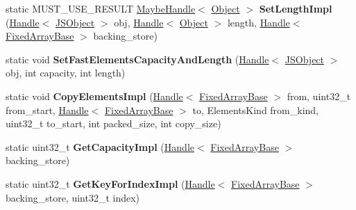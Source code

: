 \begin{DoxyCompactItemize}
\item 
\hypertarget{classv8_1_1internal_1_1_elements_accessor_base_ac2c15b95e2700cd2e8441011d1347d96}{}static M\+U\+S\+T\+\_\+\+U\+S\+E\+\_\+\+R\+E\+S\+U\+L\+T \hyperlink{classv8_1_1internal_1_1_maybe_handle}{Maybe\+Handle}$<$ \hyperlink{classv8_1_1internal_1_1_object}{Object} $>$ {\bfseries Set\+Length\+Impl} (\hyperlink{classv8_1_1internal_1_1_handle}{Handle}$<$ \hyperlink{classv8_1_1internal_1_1_j_s_object}{J\+S\+Object} $>$ obj, \hyperlink{classv8_1_1internal_1_1_handle}{Handle}$<$ \hyperlink{classv8_1_1internal_1_1_object}{Object} $>$ length, \hyperlink{classv8_1_1internal_1_1_handle}{Handle}$<$ \hyperlink{classv8_1_1internal_1_1_fixed_array_base}{Fixed\+Array\+Base} $>$ backing\+\_\+store)\label{classv8_1_1internal_1_1_elements_accessor_base_ac2c15b95e2700cd2e8441011d1347d96}

\item 
\hypertarget{classv8_1_1internal_1_1_elements_accessor_base_a0995c733f37f0fd2317efc48dc145bc6}{}static void {\bfseries Set\+Fast\+Elements\+Capacity\+And\+Length} (\hyperlink{classv8_1_1internal_1_1_handle}{Handle}$<$ \hyperlink{classv8_1_1internal_1_1_j_s_object}{J\+S\+Object} $>$ obj, int capacity, int length)\label{classv8_1_1internal_1_1_elements_accessor_base_a0995c733f37f0fd2317efc48dc145bc6}

\item 
\hypertarget{classv8_1_1internal_1_1_elements_accessor_base_a4572ad073143e585cede1aa1d5df5706}{}static void {\bfseries Copy\+Elements\+Impl} (\hyperlink{classv8_1_1internal_1_1_handle}{Handle}$<$ \hyperlink{classv8_1_1internal_1_1_fixed_array_base}{Fixed\+Array\+Base} $>$ from, uint32\+\_\+t from\+\_\+start, \hyperlink{classv8_1_1internal_1_1_handle}{Handle}$<$ \hyperlink{classv8_1_1internal_1_1_fixed_array_base}{Fixed\+Array\+Base} $>$ to, Elements\+Kind from\+\_\+kind, uint32\+\_\+t to\+\_\+start, int packed\+\_\+size, int copy\+\_\+size)\label{classv8_1_1internal_1_1_elements_accessor_base_a4572ad073143e585cede1aa1d5df5706}

\item 
\hypertarget{classv8_1_1internal_1_1_elements_accessor_base_a53f0b4465e08c70be7521c619f0eae7b}{}static uint32\+\_\+t {\bfseries Get\+Capacity\+Impl} (\hyperlink{classv8_1_1internal_1_1_handle}{Handle}$<$ \hyperlink{classv8_1_1internal_1_1_fixed_array_base}{Fixed\+Array\+Base} $>$ backing\+\_\+store)\label{classv8_1_1internal_1_1_elements_accessor_base_a53f0b4465e08c70be7521c619f0eae7b}

\item 
\hypertarget{classv8_1_1internal_1_1_elements_accessor_base_a15da950f9e4e98722f52648e047b6511}{}static uint32\+\_\+t {\bfseries Get\+Key\+For\+Index\+Impl} (\hyperlink{classv8_1_1internal_1_1_handle}{Handle}$<$ \hyperlink{classv8_1_1internal_1_1_fixed_array_base}{Fixed\+Array\+Base} $>$ backing\+\_\+store, uint32\+\_\+t index)\label{classv8_1_1internal_1_1_elements_accessor_base_a15da950f9e4e98722f52648e047b6511}

\end{DoxyCompactItemize}
